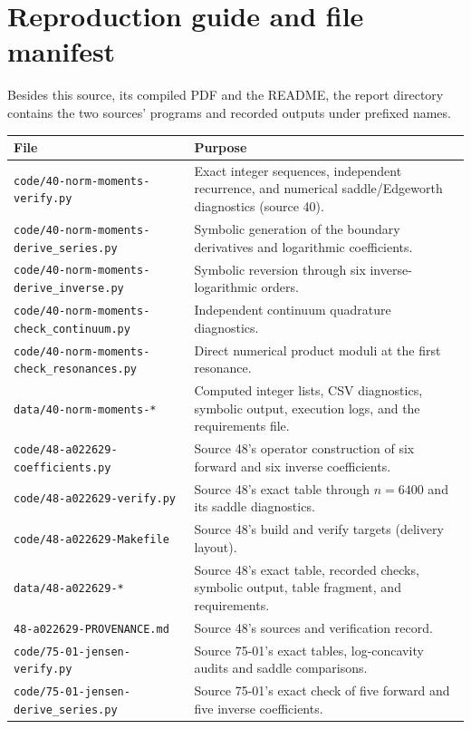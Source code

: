 \documentclass[11pt]{article}
\numberwithin{equation}{section}
\theoremstyle{definition}\newtheorem{definition}[theorem]{Definition}
\theoremstyle{remark}\newtheorem{remark}[theorem]{Remark}
\newcommand{\file}[1]{\nolinkurl{#1}}
\begin{document}
\appendix
\section{Reproduction guide and file manifest}
Besides this source, its compiled PDF and the README, the report directory
contains the two sources' programs and recorded outputs under prefixed names.
\begin{center}
\small
\begin{tabular}{>{\raggedright\arraybackslash}p{.45\linewidth}>{\raggedright\arraybackslash}p{.48\linewidth}}
\toprule
File & Purpose\\
\midrule
\file{code/40-norm-moments-verify.py} & Exact integer sequences, independent recurrence, and numerical saddle/Edgeworth diagnostics (source 40).\\
\file{code/40-norm-moments-derive_series.py} & Symbolic generation of the boundary derivatives and logarithmic coefficients.\\
\file{code/40-norm-moments-derive_inverse.py} & Symbolic reversion through six inverse-logarithmic orders.\\
\file{code/40-norm-moments-check_continuum.py} & Independent continuum quadrature diagnostics.\\
\file{code/40-norm-moments-check_resonances.py} & Direct numerical product moduli at the first resonance.\\
\file{data/40-norm-moments-*} & Computed integer lists, CSV diagnostics, symbolic output, execution logs, and the requirements file.\\
\file{code/48-a022629-coefficients.py} & Source 48's operator construction of six forward and six inverse coefficients.\\
\file{code/48-a022629-verify.py} & Source 48's exact table through $n=6400$ and its saddle diagnostics.\\
\file{code/48-a022629-Makefile} & Source 48's build and verify targets (delivery layout).\\
\file{data/48-a022629-*} & Source 48's exact table, recorded checks, symbolic output, table fragment, and requirements.\\
\file{48-a022629-PROVENANCE.md} & Source 48's sources and verification record.\\
\file{code/75-01-jensen-verify.py} & Source 75-01's exact tables, log-concavity audits and saddle comparisons.\\
\file{code/75-01-jensen-derive_series.py} & Source 75-01's exact check of five forward and five inverse coefficients.\\

\end{tabular}
\end{center}
\end{document}
